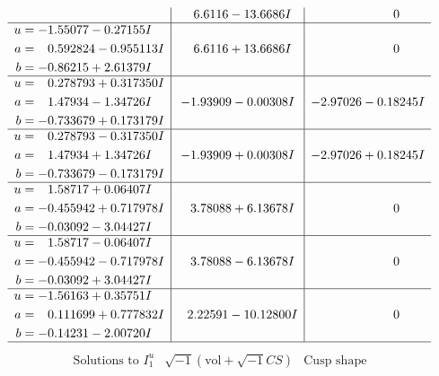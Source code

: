 \documentclass[1p]{elsarticle_modified}
\theoremstyle{definition}
\newcommand{\I}{\sqrt{-1}}
\begin{document}
$$\begin{array}{c|c|c}
 & \phantom{-}6.6116 - 13.6686 I & \phantom{-0.000000 } 0 \\ \hline\begin{aligned}
u &= -1.55077 - 0.27155 I \\
a &= \phantom{-}0.592824 - 0.955113 I \\
b &= -0.86215 + 2.61379 I\end{aligned}
 & \phantom{-}6.6116 + 13.6686 I & \phantom{-0.000000 } 0 \\ \hline\begin{aligned}
u &= \phantom{-}0.278793 + 0.317350 I \\
a &= \phantom{-}1.47934 - 1.34726 I \\
b &= -0.733679 + 0.173179 I\end{aligned}
 & -1.93909 - 0.00308 I & -2.97026 - 0.18245 I \\ \hline\begin{aligned}
u &= \phantom{-}0.278793 - 0.317350 I \\
a &= \phantom{-}1.47934 + 1.34726 I \\
b &= -0.733679 - 0.173179 I\end{aligned}
 & -1.93909 + 0.00308 I & -2.97026 + 0.18245 I \\ \hline\begin{aligned}
u &= \phantom{-}1.58717 + 0.06407 I \\
a &= -0.455942 + 0.717978 I \\
b &= -0.03092 - 3.04427 I\end{aligned}
 & \phantom{-}3.78088 + 6.13678 I & \phantom{-0.000000 } 0 \\ \hline\begin{aligned}
u &= \phantom{-}1.58717 - 0.06407 I \\
a &= -0.455942 - 0.717978 I \\
b &= -0.03092 + 3.04427 I\end{aligned}
 & \phantom{-}3.78088 - 6.13678 I & \phantom{-0.000000 } 0 \\ \hline\begin{aligned}
u &= -1.56163 + 0.35751 I \\
a &= \phantom{-}0.111699 + 0.777832 I \\
b &= -0.14231 - 2.00720 I\end{aligned}
 & \phantom{-}2.22591 - 10.12800 I & \phantom{-0.000000 } 0\\
 \hline 
 \end{array}$$\newpage$$\begin{array}{c|c|c}  
\text{Solutions to }I^u_{1}& \I (\text{vol} + \sqrt{-1}CS) & \text{Cusp shape}\\

\end{array}$$
\end{document}
